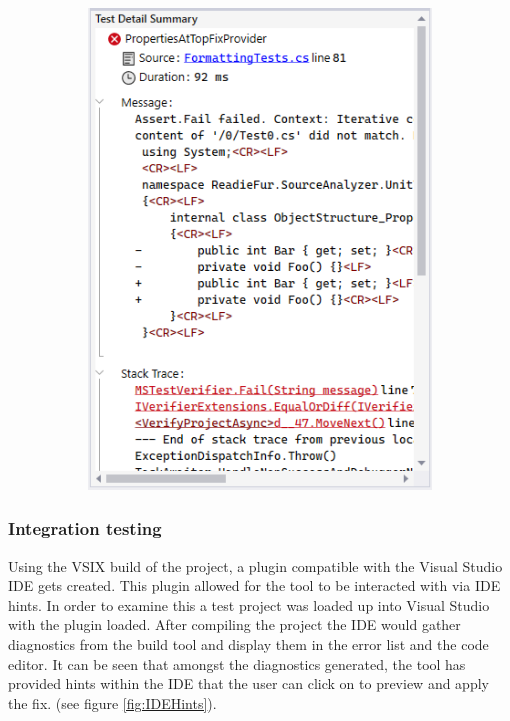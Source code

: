 \begin{figure}[H]
\begin{subfigure}[t]{0.35\textwidth}
        \includegraphics[width=\linewidth, height=0.35\textheight, keepaspectratio]{Figures/UnitTestFailing.png}
    \end{subfigure}
\end{figure}


\subsubsection{Integration testing}
Using the VSIX build of the project, a plugin compatible with the Visual Studio IDE gets created. This plugin allowed for the tool to be interacted with via IDE hints. In order to examine this a test project was loaded up into Visual Studio with the plugin loaded. After compiling the project the IDE would gather diagnostics from the build tool and display them in the error list and the code editor. It can be seen that amongst the diagnostics generated, the tool has provided hints within the IDE that the user can click on to preview and apply the fix. (see figure \ref{fig:IDEHints}).

